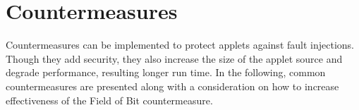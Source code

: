 \section{Countermeasures}\label{sub:faultCounter}
Countermeasures can be implemented to protect applets against fault injections. 
Though they add security, they also increase the size of the applet source and degrade performance, resulting longer run time. In the following, common countermeasures are presented along with a consideration on how to increase effectiveness of the Field of Bit countermeasure.




